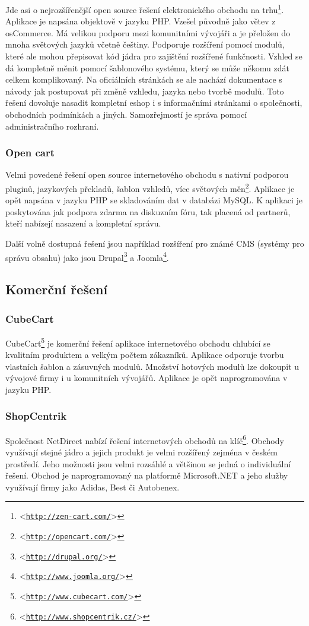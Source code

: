\documentclass[11pt,twoside,a4paper]{book}
\let\oldUrl\url
\renewcommand\url[1]{<\texttt{\oldUrl{#1}}>}
\begin{document}
Jde asi o nejrozšířenější open source řešení elektronického obchodu na trhu\footnote{\url{http://zen-cart.com/}}. Aplikace je napsána objektově v jazyku PHP. Vzešel původně jako větev z osCommerce. Má velikou podporu mezi komunitními vývojáři a je přeložen do mnoha světových jazyků včetně češtiny. Podporuje rozšíření pomocí modulů, které ale mohou přepisovat kód jádra pro zajištění rozšířené funkčnosti. Vzhled se dá kompletně měnit pomocí šablonového systému, který  se může někomu zdát celkem komplikovaný. Na oficiálních stránkách se ale nachází dokumentace s návody jak postupovat při změně vzhledu, jazyka nebo tvorbě modulů. Toto řešení dovoluje nasadit kompletní eshop i s informačními stránkami o společnosti, obchodních podmínkách a jiných. Samozřejmostí je správa pomocí administračního rozhraní. 

\subsubsection{Open cart}

Velmi povedené řešení open source internetového obchodu s nativní podporou pluginů, jazykových překladů, šablon vzhledů, více světových měn\footnote{\url{http://opencart.com/}}. Aplikace je opět napsána v jazyku PHP se skladováním dat v databázi MySQL. K aplikaci je poskytována jak podpora zdarma na diskuzním fóru, tak placená od partnerů, kteří nabízejí nasazení a kompletní správu.

Další volně dostupná řešení jsou například rozšíření pro známé CMS (systémy pro správu obsahu) jako jsou Drupal\footnote{\url{http://drupal.org/}} a Joomla\footnote{\url{http://www.joomla.org/}}.


\subsection{Komerční řešení}

\subsubsection{CubeCart}

CubeCart\footnote{\url{http://www.cubecart.com/}} je komerční řešení aplikace internetového obchodu chlubící se kvalitním produktem a velkým počtem zákazníků. Aplikace odporuje tvorbu vlastních šablon a zásuvných modulů. Množství hotových modulů lze dokoupit u vývojové firmy i u komunitních vývojářů. Aplikace je opět naprogramována v jazyku PHP.

\subsubsection{ShopCentrik}
Společnost NetDirect nabízí řešení internetových obchodů na klíč\footnote{\url{http://www.shopcentrik.cz/}}. Obchody využívají stejné jádro a jejich produkt je velmi rozšířený zejména v českém prostředí. Jeho možnosti jsou velmi rozsáhlé a většinou se jedná o individuální řešení. Obchod je naprogramovaný na platformě Microsoft.NET a jeho služby využívají firmy jako Adidas, Best či Autobenex.
\end{document}
